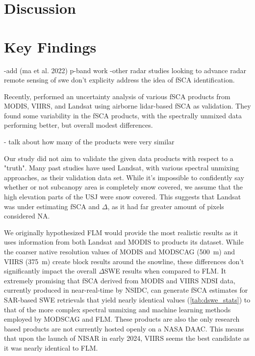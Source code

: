 \hypertarget{ch5-discussion}{\section{Discussion}\label{ch4-discussion}}
\hypertarget{ch5-discussion-1}{\section{Key Findings}\label{ch4-discussion}}

-add (ma et al. 2022) p-band work
-other radar studies looking to advance radar remote sensing of swe don't explicity address the idea of fSCA identification.

Recently, \cite{stillingerLandsatMODISVIIRS2023a} performed an uncertainty analysis of various fSCA products from MODIS, VIIRS, and Landsat using airborne lidar-based fSCA as validation. They found some variability in the fSCA products, with the spectrally unmixed data performing better, but overall modest differences. \cite{bairHowTradeoffsSatellite2023}


- talk about how many of the products were very similar

Our study did not aim to validate the given data products with respect to a "truth". Many past studies have used Landsat, with various spectral unmixing approaches, as their validation data set. While it's impossible to confidently say whether or not subcanopy area is completely snow covered, we assume that the high elevation parts of the USJ were snow covered. This suggests that Landsat was under estimating fSCA and $\Delta$, as it had far greater amount of pixels considered NA.

We originally hypothesized FLM would provide the most realistic results as it uses information from both Landsat and MODIS to products its dataset. While the coarser native resolution values of MODIS and MODSCAG (500~m) and VIIRS (375~m) create block results around the snowline, these differences don't significantly impact the overall $\Delta$SWE results when compared to FLM. It extremely promising that fSCA derived from MODIS and VIIRS NDSI data, currently produced in near-real-time by NSIDC, can generate fSCA estimates for SAR-based SWE retrievals that yield nearly identical values (\ref{tab:dswe_stats}) to that of the more complex spectral unmixing and machine learning methods employed by MODSCAG and FLM. These products are also the only research based products are not currently hosted openly on a NASA DAAC. This means that upon the launch of NISAR in early 2024, VIIRS seems the best candidate as it was nearly identical to FLM.


